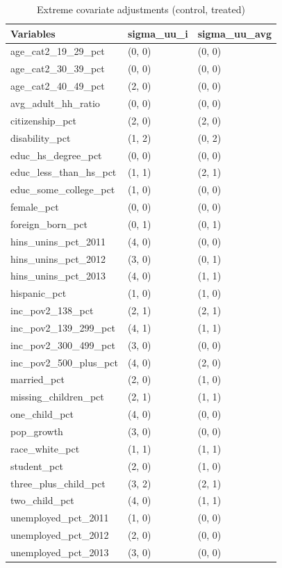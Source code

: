 \begin{table}[ht]
\centering
    \caption{Extreme covariate adjustments (control, treated)}
    \label{tab:extreme1}
\begin{tabular}{lll}
  \hline
Variables & sigma\_uu\_i & sigma\_uu\_avg \\ 
  \hline
age\_cat2\_19\_29\_pct & (0, 0) & (0, 0) \\ 
  age\_cat2\_30\_39\_pct & (0, 0) & (0, 0) \\ 
  age\_cat2\_40\_49\_pct & (2, 0) & (0, 0) \\ 
  avg\_adult\_hh\_ratio & (0, 0) & (0, 0) \\ 
  citizenship\_pct & (2, 0) & (2, 0) \\ 
  disability\_pct & (1, 2) & (0, 2) \\ 
  educ\_hs\_degree\_pct & (0, 0) & (0, 0) \\ 
  educ\_less\_than\_hs\_pct & (1, 1) & (2, 1) \\ 
  educ\_some\_college\_pct & (1, 0) & (0, 0) \\ 
  female\_pct & (0, 0) & (0, 0) \\ 
  foreign\_born\_pct & (0, 1) & (0, 1) \\ 
  hins\_unins\_pct\_2011 & (4, 0) & (0, 0) \\ 
  hins\_unins\_pct\_2012 & (3, 0) & (0, 1) \\ 
  hins\_unins\_pct\_2013 & (4, 0) & (1, 1) \\ 
  hispanic\_pct & (1, 0) & (1, 0) \\ 
  inc\_pov2\_138\_pct & (2, 1) & (2, 1) \\ 
  inc\_pov2\_139\_299\_pct & (4, 1) & (1, 1) \\ 
  inc\_pov2\_300\_499\_pct & (3, 0) & (0, 0) \\ 
  inc\_pov2\_500\_plus\_pct & (4, 0) & (2, 0) \\ 
  married\_pct & (2, 0) & (1, 0) \\ 
  missing\_children\_pct & (2, 1) & (1, 1) \\ 
  one\_child\_pct & (4, 0) & (0, 0) \\ 
  pop\_growth & (3, 0) & (0, 0) \\ 
  race\_white\_pct & (1, 1) & (1, 1) \\ 
  student\_pct & (2, 0) & (1, 0) \\ 
  three\_plus\_child\_pct & (3, 2) & (2, 1) \\ 
  two\_child\_pct & (4, 0) & (1, 1) \\ 
  unemployed\_pct\_2011 & (1, 0) & (0, 0) \\ 
  unemployed\_pct\_2012 & (2, 0) & (0, 0) \\ 
  unemployed\_pct\_2013 & (3, 0) & (0, 0) \\ 
   \bottomrule
\end{tabular}
\end{table}

